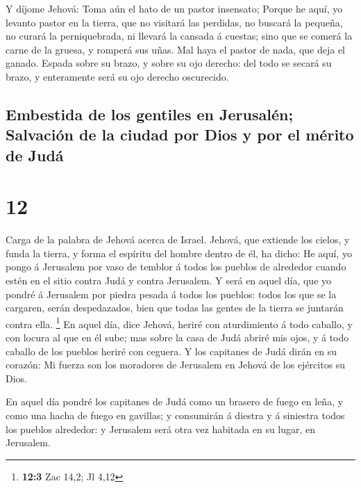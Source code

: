  Y díjome Jehová: Toma aún el hato de un pastor
insensato;  Porque he aquí, yo levanto pastor en la
tierra, que no visitará las perdidas, no buscará la pequeña, no curará
la perniquebrada, ni llevará la cansada á cuestas; sino que se comerá la
carne de la gruesa, y romperá sus uñas.  Mal haya el
pastor de nada, que deja el ganado. Espada sobre su brazo, y sobre su
ojo derecho: del todo se secará su brazo, y enteramente será su ojo
derecho oscurecido.

\hypertarget{embestida-de-los-gentiles-en-jerusaluxe9n-salvaciuxf3n-de-la-ciudad-por-dios-y-por-el-muxe9rito-de-juduxe1}{%
\subsection{Embestida de los gentiles en Jerusalén; Salvación de la
ciudad por Dios y por el mérito de
Judá}\label{embestida-de-los-gentiles-en-jerusaluxe9n-salvaciuxf3n-de-la-ciudad-por-dios-y-por-el-muxe9rito-de-juduxe1}}

\hypertarget{section-11}{%
\section{12}\label{section-11}}

 Carga de la palabra de Jehová acerca de Israel. Jehová,
que extiende los cielos, y funda la tierra, y forma el espíritu del
hombre dentro de él, ha dicho:  He aquí, yo pongo á
Jerusalem por vaso de temblor á todos los pueblos de alrededor cuando
estén en el sitio contra Judá y contra Jerusalem.  Y será
en aquel día, que yo pondré á Jerusalem por piedra pesada á todos los
pueblos: todos los que se la cargaren, serán despedazados, bien que
todas las gentes de la tierra se juntarán contra ella. \footnote{\textbf{12:3}
  Zac 14,2; Jl 4,12}  En aquel día, dice Jehová, heriré
con aturdimiento á todo caballo, y con locura al que en él sube; mas
sobre la casa de Judá abriré mis ojos, y á todo caballo de los pueblos
heriré con ceguera.  Y los capitanes de Judá dirán en su
corazón: Mi fuerza son los moradores de Jerusalem en Jehová de los
ejércitos su Dios.

 En aquel día pondré los capitanes de Judá como un brasero
de fuego en leña, y como una hacha de fuego en gavillas; y consumirán á
diestra y á siniestra todos los pueblos alrededor: y Jerusalem será otra
vez habitada en su lugar, en Jerusalem.

